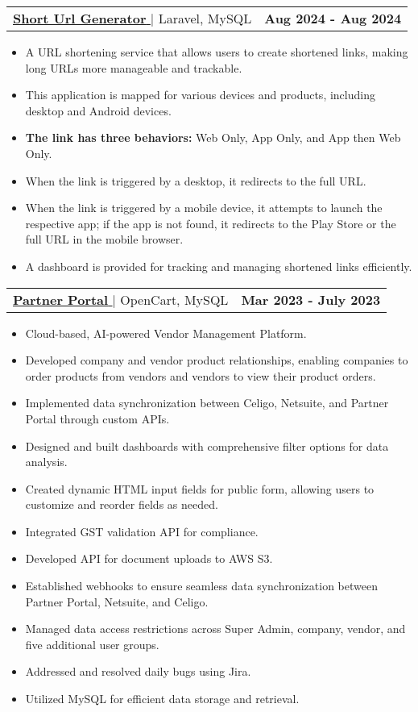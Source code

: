 \documentclass[letterpaper,11pt]{article}
\makeatletter
\newcommand{\resumeItem}[1]{
  \item\small{
    {#1 \vspace{-2pt}}
  }
}
\newcommand{\resumeProjectHeading}[2]{
    \item
    \begin{tabular*}{1.001\textwidth}{l@{\extracolsep{\fill}}r}
      \small#1 & \textbf{\small #2}\\
    \end{tabular*}\vspace{-7pt}
}
\newcommand{\resumeItemListStart}{\begin{itemize}}
\newcommand{\resumeItemListEnd}{\end{itemize}\vspace{-5pt}}
\makeatother
\begin{document}
      \resumeProjectHeading
          {\href{}{\textbf{\large{\underline{Short Url Generator}}} \href{}{\raisebox{-0.1\height}\faExternalLink }} $|$ \large{Laravel, MySQL}}{Aug 2024 - Aug 2024}
          \resumeItemListStart
            \resumeItem{\normalsize{A URL shortening service that allows users to create shortened links, making long URLs more manageable and trackable.}}
            \resumeItem{\normalsize{This application is mapped for various devices and products, including desktop and Android devices.}}
            \resumeItem{\normalsize{\textbf{The link has three behaviors:} Web Only, App Only, and App then Web Only.}}
            \resumeItem{\normalsize{When the link is triggered by a desktop, it redirects to the full URL.}}
            \resumeItem{\normalsize{When the link is triggered by a mobile device, it attempts to launch the respective app; if the app is not found, it redirects to the Play Store or the full URL in the mobile browser.}}
            \resumeItem{\normalsize{A dashboard is provided for tracking and managing shortened links efficiently.}}
          \resumeItemListEnd
          \vspace{-13pt}
          
      \resumeProjectHeading
          {\href{https://partnerportal.ai}{\textbf{\large{\underline{Partner Portal}}} \href{https://partnerportal.ai}{\raisebox{-0.1\height}\faExternalLink }} $|$ \large{OpenCart, MySQL}}{Mar 2023 - July 2023}
          \resumeItemListStart
            \resumeItem{\normalsize{Cloud-based, AI-powered Vendor Management Platform.}}
            \resumeItem{\normalsize{Developed company and vendor product relationships, enabling companies to order products from vendors and vendors to view their product orders.}}
            \resumeItem{\normalsize{Implemented data synchronization between Celigo, Netsuite, and Partner Portal through custom APIs.}}
            \resumeItem{\normalsize{Designed and built dashboards with comprehensive filter options for data analysis.}}
            \resumeItem{\normalsize{Created dynamic HTML input fields for public form, allowing users to customize and reorder fields as needed.}}
            \resumeItem{\normalsize{Integrated GST validation API for compliance.}}
            \resumeItem{\normalsize{Developed API for document uploads to AWS S3.}}
            \resumeItem{\normalsize{Established webhooks to ensure seamless data synchronization between Partner Portal, Netsuite, and Celigo.}}
            \resumeItem{\normalsize{Managed data access restrictions across Super Admin, company, vendor, and five additional user groups.}}
            \resumeItem{\normalsize{Addressed and resolved daily bugs using Jira.}}
            \resumeItem{\normalsize{Utilized MySQL for efficient data storage and retrieval.}}
          \resumeItemListEnd
          \vspace{-13pt}
\end{document}
